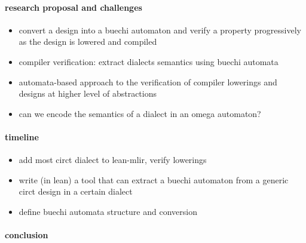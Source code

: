 \documentclass[]{article}
\begin{document}
\paragraph{research proposal and challenges}

\begin{itemize}
    \item convert a design into a buechi automaton and verify a property progressively as the design is lowered and compiled 
    \item compiler verification: extract dialects semantics using buechi automata 
    \item automata-based approach to the verification of compiler lowerings and designs at higher level of abstractions 
    \item can we encode the semantics of a dialect in an omega automaton?
\end{itemize}

\paragraph{timeline}
\begin{itemize}
    \item add most circt dialect to lean-mlir, verify lowerings
    \item write (in lean) a tool that can extract a buechi automaton from a generic circt design in a certain dialect
    \item define buechi automata structure and conversion 
\end{itemize}
\paragraph{conclusion} 
\end{document}
